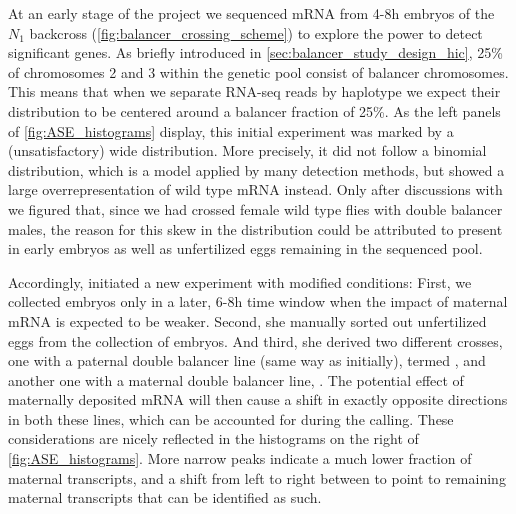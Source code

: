 
At an early stage of the project we sequenced mRNA from 4-8h embryos of the
$N_1$ backcross (\cref{fig:balancer_crossing_scheme}) to explore the power to
detect significant \ase genes. As briefly introduced in
\cref{sec:balancer_study_design_hic}, 25\% of chromosomes 2 and 3 within the
genetic pool consist of balancer chromosomes. This means that when we separate
RNA-seq reads by haplotype we expect their distribution to be centered around a
balancer fraction of 25\%. As the left panels of \cref{fig:ASE_histograms}
display, this initial experiment was marked by a (unsatisfactory) wide
distribution. More precisely, it did not follow a binomial distribution, which
is a model applied by many \ase detection methods, but showed a large
overrepresentation of wild type mRNA instead. Only after discussions with
\garfield we figured that, since we had crossed female wild type flies with double
balancer males, the reason for this skew in the distribution could be attributed
to 
present in early embryos as well as unfertilized eggs remaining in the sequenced
pool.

Accordingly, \yad initiated a new experiment with modified conditions: First, we
collected embryos only in a later, 6-8h time window when the impact of maternal
mRNA is expected to be weaker. Second, she manually sorted out unfertilized eggs
from the collection of embryos. And third, she derived two different crosses,
one with a paternal double balancer line (same way as initially), termed \Npat,
and another one with a maternal double balancer line, \Nmat. The potential
effect of maternally deposited mRNA will then cause a shift in exactly opposite
directions in both these lines, which can be accounted for during the \ase
calling. These considerations are nicely reflected in the histograms on the
right of \cref{fig:ASE_histograms}. More narrow peaks indicate a much lower
fraction of maternal transcripts, and a shift from left to right between \Npat
to \Nmat point to remaining maternal transcripts that can be identified as such.






